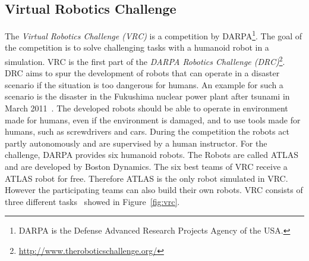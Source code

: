 \subsection{Virtual Robotics Challenge}
The \textit{Virtual Robotics Challenge (VRC)} is a competition by DARPA\footnote{DARPA is the Defense Advanced Research Projects Agency of the USA.}. The goal of the competition is to solve challenging tasks with a humanoid robot in a simulation. VRC is the first part of the \textit{DARPA Robotics Challenge (DRC)}\footnote{\url{http://www.theroboticschallenge.org/}}. DRC aims to spur the development of robots that can operate in a disaster scenario if the situation is too dangerous for humans. An example for such a scenario is the disaster in the Fukushima nuclear power plant after tsunami in March 2011~\cite{fukushima}. The developed robots should be able to operate in environment made for humans, even if the environment is damaged, and to use tools made for humans, such as screwdrivers and cars. During the competition the robots act partly autonomously and are supervised by a human instructor. For the challenge, DARPA provides six humanoid robots. The Robots are called ATLAS and are developed by Boston Dynamics. The six best teams of VRC receive a ATLAS robot for free. Therefore ATLAS is the only robot simulated in VRC. However the participating teams can also build their own robots. VRC consists of three different tasks~\cite{vrc_rules} showed in Figure~\ref{fig:vrc}.

